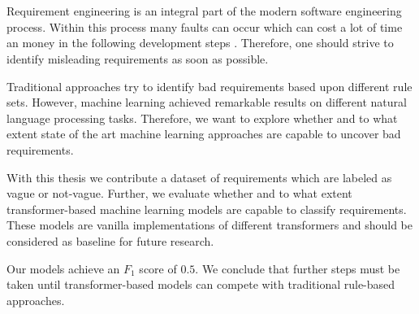 \chapter{\abstractname}

Requirement engineering is an integral part of the modern software engineering process.
Within this process many faults can occur which can cost a lot of time an money in the following development steps \parencite{Mendez:2016}.
Therefore, one should strive to identify misleading requirements as soon as possible.

Traditional approaches try to identify bad requirements based upon different rule sets.
However, machine learning achieved remarkable results on different natural language processing tasks.
Therefore, we want to explore whether and to what extent state of the art machine learning approaches are capable to uncover bad requirements.

With this thesis we contribute a dataset of requirements which are labeled as vague or not-vague.
Further, we evaluate whether and to what extent transformer-based machine learning models are capable to classify requirements.
These models are vanilla implementations of different transformers and should be considered as baseline for future research.

Our models achieve an $F_1$ score of $0.5$.
We conclude that further steps must be taken until transformer-based models can compete with traditional rule-based approaches.
